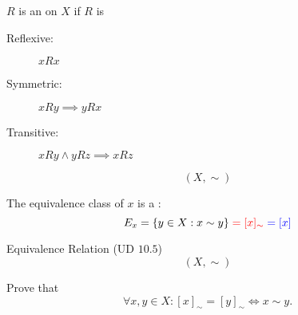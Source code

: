 \begin{frame}{}
  \begin{definition}
    $R$ is an  on $X$ if $R$ is
    \begin{description}
      \item[Reflexive:] $x R x$ \vspace{-0.30cm}
      \item[Symmetric:] $x R y \implies y R x$
      \item[Transitive:] $x R y \land y R z \implies x R z$
    \end{description}
  \end{definition}
\end{frame}

\begin{frame}{}
  \begin{definition}
    \[
      (X, \sim)
    \]

    The equivalence class of $x$ is a :
    \[
      E_{x} = \{y \in X: x \sim y\} \; \textcolor{red}{= [x]_{\sim}} \; \textcolor{blue}{= [x]}
    \]
  \end{definition}
\end{frame}

\begin{frame}{}
  \begin{exampleblock}{Equivalence Relation (UD $10.5$)}
    \[
      (X, \sim)
    \]

    Prove that 
    \[
      \forall x, y \in X: [x]_{\sim} = [y]_{\sim} \iff x \sim y.
    \]
  \end{exampleblock}
\end{frame}

\begin{frame}{}
  \centerline{}


  \pause
\end{frame}

